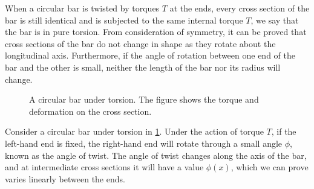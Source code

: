 \documentclass[
fontsize=10pt,
a4paper,
twosides=false,
open=any,
svgnames,
]{kaobook} %
\begin{document}
When a circular bar is twisted by torques $T$ at the ends, every cross section of the bar is still identical and is subjected to the same internal torque $T$, we say that the bar is in pure torsion. From consideration of symmetry, it can be proved that cross sections of the bar do not change in shape as they rotate about the longitudinal axis. Furthermore, if the angle of rotation between one end of the bar and the other is small, neither the length of the bar nor its radius will change.

\begin{figure}[h]
  \centering
  \caption{A circular bar under torsion. The figure shows the torque and deformation on the cross section.}
  \label{fig: 3d torsional deformation}
\end{figure}

Consider a circular bar under torsion in \cref{fig: 3d torsional deformation}. Under the action of torque $T$, if the left-hand end is fixed, the right-hand end will rotate through a small angle $\phi$, known as the angle of twist. The angle of twist changes along the axis of the bar, and at intermediate cross sections it will have a value $\phi(x)$, which we can prove varies linearly between the ends.
\end{document}
